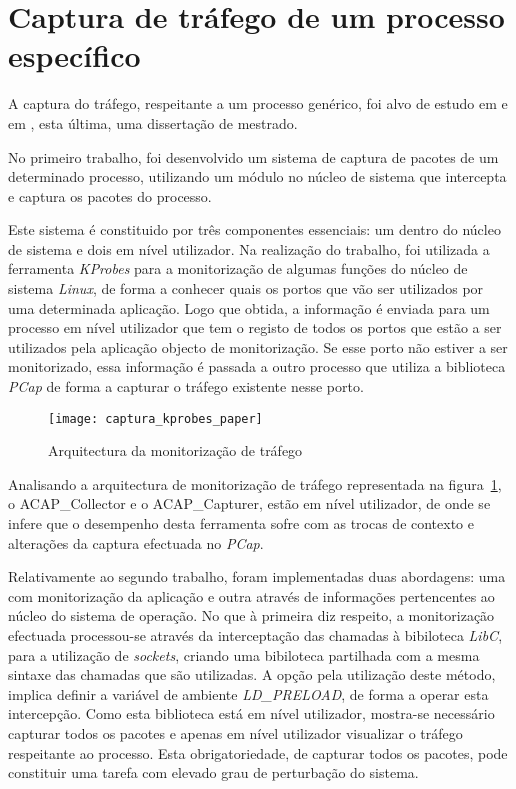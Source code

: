 \section{Captura de tráfego de um processo específico}
\label{sect:outras_abordagens}

A captura do tráfego, respeitante a um processo genérico, foi alvo de estudo em \cite{1688981} e em \cite{duarte10,Farruca:2009}, esta última, uma dissertação de mestrado.

No primeiro trabalho, foi desenvolvido um sistema de captura de pacotes de um determinado processo, utilizando um módulo no núcleo de sistema que intercepta e captura os pacotes do processo.

Este sistema é constituido por três componentes essenciais: um dentro do núcleo de sistema e dois em nível utilizador.
Na realização do trabalho, foi utilizada a ferramenta \textit{KProbes} para a monitorização de algumas funções do núcleo de sistema \textit{Linux}, de forma a conhecer quais os portos que vão ser utilizados por uma determinada aplicação.
Logo que obtida, a informação é enviada para um processo em nível utilizador que tem o registo de todos os portos que estão a ser utilizados pela aplicação objecto de monitorização.
Se esse porto não estiver a ser monitorizado, essa informação é passada a outro processo que utiliza a biblioteca \textit{PCap} de forma a capturar o tráfego existente nesse porto.


\begin{figure}[h!]
       \centering
       \texttt{[image: captura\_kprobes\_paper]}
       \caption{Arquitectura da monitorização de tráfego \cite{1688981}}
	\label{fig:paper_capture_kprobes}
\end{figure}


Analisando a arquitectura de monitorização de tráfego representada na figura~\ref{fig:paper_capture_kprobes}, o ACAP\_Collector e o ACAP\_Capturer, estão em nível utilizador, de onde se infere que o desempenho desta ferramenta sofre com as trocas de contexto e alterações da captura efectuada no \textit{PCap}.

Relativamente ao segundo trabalho, foram implementadas duas abordagens: uma com monitorização da aplicação e outra através de informações pertencentes ao núcleo do sistema de operação.
No que à primeira diz respeito, a monitorização efectuada processou-se através da interceptação das chamadas à bibiloteca \textit{LibC}, para a utilização de \textit{sockets}, criando uma bibiloteca partilhada com a mesma sintaxe das chamadas que são utilizadas.
A opção pela utilização deste método, implica definir a variável de ambiente \textit{LD\_PRELOAD}, de forma a operar esta intercepção.
Como esta biblioteca está em nível utilizador, mostra-se necessário capturar todos os pacotes e apenas em nível utilizador visualizar o tráfego respeitante ao processo.
Esta obrigatoriedade, de capturar todos os pacotes, pode constituir uma tarefa com elevado grau de perturbação do sistema.

